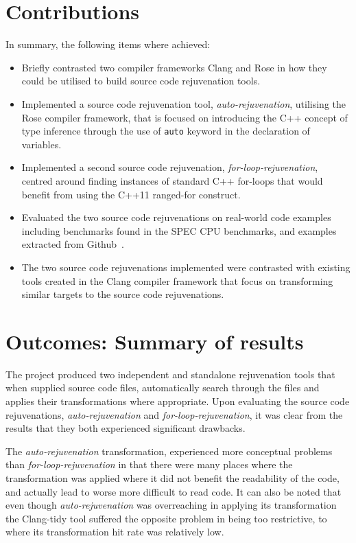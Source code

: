 \documentclass[bsc,frontabs,singlespacing,twoside,parskip,deptreport]{infthesis}
\begin{document}
\section{Contributions}
In summary, the following items where achieved:
\begin{itemize}
    \item Briefly contrasted two compiler frameworks Clang and Rose in how they could be utilised to build source code rejuvenation tools.
    \item Implemented a source code rejuvenation tool, \textit{auto-rejuvenation}, utilising the Rose compiler framework, that is focused on introducing the C++ concept of type inference through the use of \texttt{auto} keyword in the declaration of variables.
    \item Implemented a second source code rejuvenation, \textit{for-loop-rejuvenation}, centred around finding instances of standard  C++ for-loops that would benefit from using the C++11 ranged-for construct. 
    \item Evaluated the two source code rejuvenations on real-world code examples including benchmarks found in the SPEC CPU benchmarks, and examples extracted from Github~\cite{GITHUB}. 
    \item The two source code rejuvenations implemented were contrasted with existing tools created in the Clang compiler framework that focus on transforming similar targets to the source code rejuvenations.  
\end{itemize}

\section{Outcomes: Summary of results}

The project produced two independent and standalone rejuvenation tools that when supplied source code files, automatically search through the files and applies their transformations where appropriate. Upon evaluating the source code rejuvenations, \textit{auto-rejuvenation} and \textit{for-loop-rejuvenation}, it was clear from the results that they both experienced significant drawbacks.

The \textit{auto-rejuvenation} transformation, experienced more conceptual problems than \textit{for-loop-rejuvenation} in that there were many places where the transformation was applied where it did not benefit the readability of the code, and actually lead to worse more difficult to read code. It can also be noted that even though \textit{auto-rejuvenation} was overreaching in applying its transformation the Clang-tidy tool suffered the opposite problem in being too restrictive, to where its transformation hit rate was relatively low.  
\end{document}
